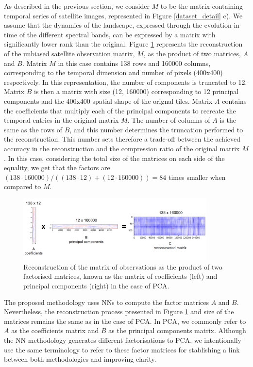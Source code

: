 \documentclass[essd, manuscript]{copernicus}
\begin{document}
As described in the previous section, we consider $M$ to be the matrix containing temporal series of satellite images, represented in Figure \ref{dataset_detail} c). We assume that the dynamics of the landscape, expressed through the evolution in time of the different spectral bands, can be expressed by a matrix with significantly lower rank than the original. Figure \ref{factorisation} represents the reconstruction of the unbiased satellite observation matrix, $M$, as the product of two matrices, $A$ and $B$. Matrix $M$ in this case contains 138 rows and 160000 columns, corresponding to the temporal dimension and number of pixels (400x400) respectively. In this representation, the number of components is truncated to 12. Matrix $B$ is then a matrix with size (12, 160000) corresponding to 12 principal components and the 400x400 spatial shape of the orignal tiles. Matrix $A$ contains the coefficients that multiply each of the principal components to recreate the temporal entries in the original matrix $M$. The number of columns of $A$ is the same as the rows of $B$, and this number determines the truncation performed to the reconstruction. This number sets therefore a trade-off between the achieved accuracy in the reconstruction and the compression ratio of the original matrix $M$. In this case, considering the total size of the matrices on each side of the equality, we get that the factors are $(138 \cdot 160000) / ((138 \cdot 12) + (12 \cdot 160000)) = 84 $ times smaller when compared to $M$. 

\begin{figure}%
    \includegraphics[width=10cm]{fig3.png}
	\caption{Reconstruction of the matrix of observations as the product of two factorised matrices, known as the matrix of coefficients (left) and principal components (right) in the case of PCA.}%
    \label{factorisation}%
\end{figure}

The proposed methodology uses NNs to compute the factor matrices $A$ and $B$. Nevertheless, the reconstruction process presented in Figure \ref{factorisation} and size of the matrices remains the same as in the case of PCA. In PCA, we commonly refer to $A$ as the coefficients matrix and $B$ as the principal components matrix. Although the NN methodology generates different factorisations to PCA, we intentionally use the same terminology to refer to these factor matrices for stablishing a link between both methodologies and improving clarity.
\end{document}
